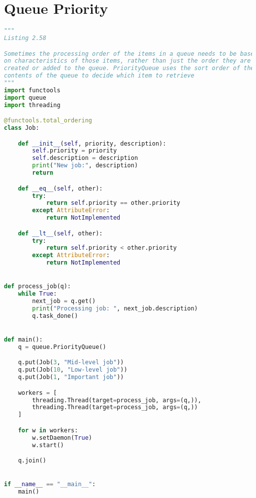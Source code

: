 \documentclass[a4paper,landscape]{report}
\begin{document}
\section{Queue Priority}
\begin{lstlisting}[language=Python]
"""
Listing 2.58

Sometimes the processing order of the items in a queue needs to be based
on characteristics of those items, rather than just the order they are
created or added to the queue. PriorityQueue uses the sort order of the
contents of the queue to decide which item to retrieve
"""
import functools
import queue
import threading

@functools.total_ordering
class Job:

    def __init__(self, priority, description):
        self.priority = priority
        self.description = description
        print("New job:", description)
        return

    def __eq__(self, other):
        try:
            return self.priority == other.priority
        except AttributeError:
            return NotImplemented

    def __lt__(self, other):
        try:
            return self.priority < other.priority
        except AttributeError:
            return NotImplemented


def process_job(q):
    while True:
        next_job = q.get()
        print("Processing job: ", next_job.description)
        q.task_done()


def main():
    q = queue.PriorityQueue()

    q.put(Job(3, "Mid-level job"))
    q.put(Job(10, "Low-level job"))
    q.put(Job(1, "Important job"))

    workers = [
        threading.Thread(target=process_job, args=(q,)),
        threading.Thread(target=process_job, args=(q,))
    ]

    for w in workers:
        w.setDaemon(True)
        w.start()

    q.join()


if __name__ == "__main__":
    main()

\end{lstlisting}
\end{document}
